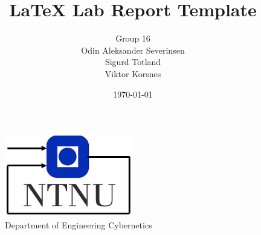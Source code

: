 \documentclass[11pt, a4paper, USenglish]{article} %
\begin{document}
\title{LaTeX Lab Report Template}
\author{Group 16\\Odin Aleksander Severinsen\\Sigurd Totland\\Viktor Korsnes}
\date{\today}
\begin{titlepage}
    \maketitle
    \begin{figure}
    \centering
    \includegraphics[width=0.5\textwidth]{figures/itk_ntnu}\\
    Department of Engineering Cybernetics
    \end{figure}
    \thispagestyle{empty}
\end{titlepage}

\newpage

\thispagestyle{empty} %

\newpage
\tableofcontents
\thispagestyle{empty} %

\newpage
\setcounter{page}{1}








\newpage
{}
\printbibliography{}
\label{sec:bibliography}
\end{document}
